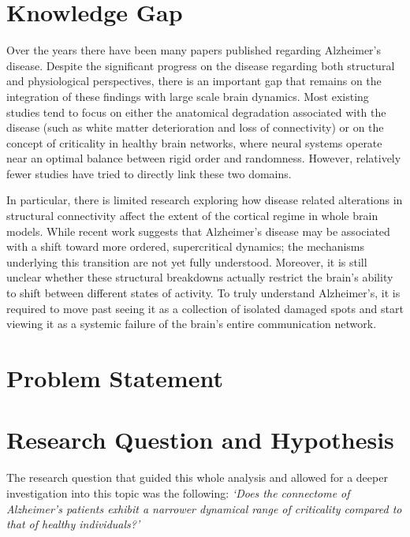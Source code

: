 \documentclass[12pt,a4paper]{article}
\begin{document}
\section{Knowledge Gap}

Over the years there have been many papers published regarding Alzheimer's disease. Despite the significant progress on the disease regarding both structural and physiological perspectives, there is an important gap that remains on the integration of these findings with large scale brain dynamics. Most existing studies tend to focus on either the anatomical degradation associated with the disease (such as white matter deterioration and loss of connectivity) or on the concept of criticality in healthy brain networks, where neural systems operate near an optimal balance between rigid order and randomness. However, relatively fewer studies have tried to directly link these two domains.

In particular, there is limited research exploring how disease related alterations in structural connectivity affect the extent of the cortical regime in whole brain models. While recent work suggests that Alzheimer's disease may be associated with a shift toward more ordered, supercritical dynamics; the mechanisms underlying this transition are not yet fully understood. Moreover, it is still unclear whether these structural breakdowns actually restrict the brain's ability to shift between different states of activity. To truly understand Alzheimer's, it is required to move past seeing it as a collection of isolated damaged spots and start viewing it as a systemic failure of the brain's entire communication network.

\section{Problem Statement}


\section{Research Question and Hypothesis}

The research question that guided this whole analysis and allowed for a deeper investigation into this topic was the following: \emph{`Does the connectome of Alzheimer's patients exhibit a narrower dynamical range of criticality compared to that of healthy individuals?'}
\end{document}

